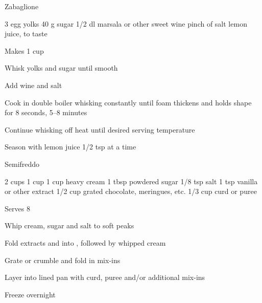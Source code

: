 \begin{recipe}{Zabaglione}{\vegetarian{}}
\begin{ingredients}
3 egg yolks
40 g sugar
1/2 dl marsala or other sweet wine
pinch of salt
lemon juice, to taste
\end{ingredients}
\nextcolumn
Makes 1 cup
\begin{steps}
    \item Whisk yolks and sugar until smooth
    \item Add wine and salt
    \item Cook in double boiler whisking constantly until foam thickens and holds shape for 8 seconds, 5--8 minutes
    \item Continue whisking off heat until desired serving temperature
    \item Season with lemon juice 1/2 tsp at a time
\end{steps}
\end{recipe}

\begin{recipe}{Semifreddo}{\vegetarian{}}
\begin{ingredients}
2 cups 
1 cup 
1 cup heavy cream
1 tbsp powdered sugar
1/8 tsp salt
1 tsp vanilla or other extract
1/2 cup grated chocolate, meringues, etc.
1/3 cup curd or puree
\end{ingredients}
\nextcolumn
Serves 8
\begin{steps}
    \item Whip cream, sugar and salt to soft peaks
    \item Fold extracts and  into , followed by whipped cream 
    \item Grate or crumble and fold in mix-ins
    \item Layer into lined pan with curd, puree and/or additional mix-ins
    \item Freeze overnight
\end{steps}
\end{recipe}

